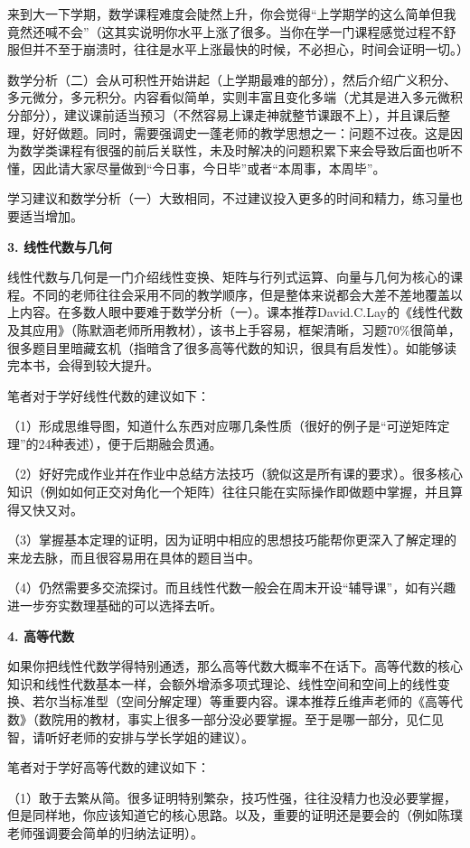 \documentclass[11pt,oneside]{book}
\begin{document}
来到大一下学期，数学课程难度会陡然上升，你会觉得“上学期学的这么简单但我竟然还喊不会”（这其实说明你水平上涨了很多。当你在学一门课程感觉过程不舒服但并不至于崩溃时，往往是水平上涨最快的时候，不必担心，时间会证明一切。）

数学分析（二）会从可积性开始讲起（上学期最难的部分），然后介绍广义积分、多元微分，多元积分。内容看似简单，实则丰富且变化多端（尤其是进入多元微积分部分），建议课前适当预习（不然容易上课走神就整节课跟不上），并且课后整理，好好做题。同时，需要强调史一蓬老师的教学思想之一：问题不过夜。这是因为数学类课程有很强的前后关联性，未及时解决的问题积累下来会导致后面也听不懂，因此请大家尽量做到“今日事，今日毕”或者“本周事，本周毕”。

学习建议和数学分析（一）大致相同，不过建议投入更多的时间和精力，练习量也要适当增加。

\textbf{3. 线性代数与几何} 

线性代数与几何是一门介绍线性变换、矩阵与行列式运算、向量与几何为核心的课程。不同的老师往往会采用不同的教学顺序，但是整体来说都会大差不差地覆盖以上内容。在多数人眼中要难于数学分析（一）。课本推荐David.C.Lay的《线性代数及其应用》（陈默涵老师所用教材），该书上手容易，框架清晰，习题70\%很简单，很多题目里暗藏玄机（指暗含了很多高等代数的知识，很具有启发性）。如能够读完本书，会得到较大提升。

笔者对于学好线性代数的建议如下：

（1）形成思维导图，知道什么东西对应哪几条性质（很好的例子是“可逆矩阵定理”的24种表述），便于后期融会贯通。

（2）好好完成作业并在作业中总结方法技巧（貌似这是所有课的要求）。很多核心知识（例如如何正交对角化一个矩阵）往往只能在实际操作即做题中掌握，并且算得又快又对。

（3）掌握基本定理的证明，因为证明中相应的思想技巧能帮你更深入了解定理的来龙去脉，而且很容易用在具体的题目当中。

（4）仍然需要多交流探讨。而且线性代数一般会在周末开设“辅导课”，如有兴趣进一步夯实数理基础的可以选择去听。

 \textbf{4. 高等代数}

如果你把线性代数学得特别通透，那么高等代数大概率不在话下。高等代数的核心知识和线性代数基本一样，会额外增添多项式理论、线性空间和空间上的线性变换、若尔当标准型（空间分解定理）等重要内容。课本推荐丘维声老师的《高等代数》（数院用的教材，事实上很多一部分没必要掌握。至于是哪一部分，见仁见智，请听好老师的安排与学长学姐的建议）。

笔者对于学好高等代数的建议如下：

（1）敢于去繁从简。很多证明特别繁杂，技巧性强，往往没精力也没必要掌握，但是同样地，你应该知道它的核心思路。以及，重要的证明还是要会的（例如陈璞老师强调要会简单的归纳法证明）。
\end{document}

